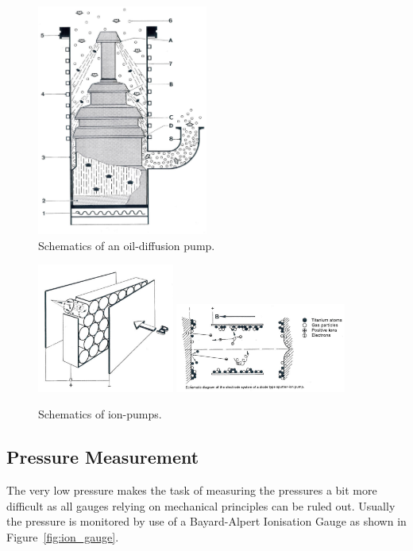 \begin{figure}[htbp]
\centering
\includegraphics[width=0.5\textwidth]{figures/02_02}
\caption{Schematics of an oil-diffusion pump.}
\label{fig:oildiffusion_pump}
\end{figure}

\begin{figure}[htbp]
\centering
\includegraphics[width=0.4\textwidth]{figures/02_03a}
\includegraphics[width=0.5\textwidth]{figures/02_03b}
\caption{Schematics of ion-pumps.}
\label{fig:ion_pump}
\end{figure}

\subsection{Pressure Measurement}
The very low pressure makes the task of measuring the pressures a bit more difficult as all gauges relying on mechanical principles can be ruled out. Usually the pressure is monitored by use of a Bayard-Alpert Ionisation Gauge as shown in Figure~\ref{fig:ion_gauge}.

